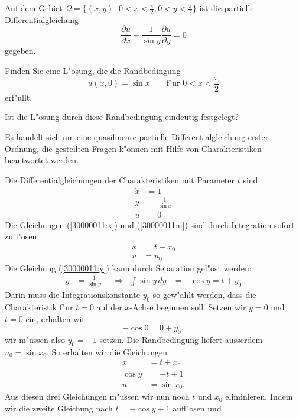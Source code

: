 Auf dem Gebiet $\Omega=\{(x,y)\,|\,0<x<\frac{\pi}2,0<y<\frac{\pi}2\}$
ist die partielle Differentialgleichung
\begin{equation}
\frac{\partial u}{\partial x}
+
\frac1{\sin y}\frac{\partial u}{\partial y}
=
0
\label{30000011:equation}
\end{equation}
gegeben.
\begin{teilaufgaben}
\item
Finden Sie eine L"osung, die die Randbedingung
\[
u(x,0)=\sin x\qquad \text{f"ur $0<x<\frac{\pi}2$}
\]
erf"ullt.
\item
Ist die L"osung durch diese Randbedingung eindeutig festgelegt?
\end{teilaufgaben}

\begin{loesung}
Es handelt sich um eine quasilineare partielle Differentialgleichung erster
Ordnung, die gestellten Fragen k"onnen mit Hilfe von Charakteristiken
beantwortet werden.
\begin{teilaufgaben}
\item
Die Differentialgleichungen der Charakteristiken mit Parameter $t$ sind
\begin{align}
\dot x&=1
\label{30000011:x}
\\
\dot y&=\frac1{\sin x}
\label{30000011:y}
\\
\dot u&=0
\label{30000011:u}
\end{align}
Die Gleichungen (\ref{30000011:x}) und (\ref{30000011:u}) sind durch
Integration sofort zu l"osen:
\begin{align*}
x&=t+x_0\\
u&=u_0
\end{align*}
Die Gleichung (\ref{30000011:y}) kann durch Separation gel"ost werden:
\[
\begin{aligned}
\dot y&=\frac1{\sin y}
&&\Rightarrow&
\int \sin y\,dy&=-\cos y=t+y_0
\end{aligned}
\]
Darin muss die Integrationskonstante $y_0$ so gew"ahlt werden,
dass die Charakteristik f"ur $t=0$ auf der $x$-Achse beginnen soll.
Setzen wir $y=0$ und $t=0$ ein, erhalten wir
\[
-\cos 0=0+y_0,
\]
wir m"ussen also $y_0=-1$ setzen.
Die Randbedingung liefert ausserdem $u_0=\sin x_0$. So
erhalten wir die Gleichungen
\begin{align*}
x&=t+x_0\\
\cos y&=-t+1\\
u&=\sin x_0.
\end{align*}
Aus diesen drei Gleichungen m"ussen wir nun noch $t$ und $x_0$ eliminieren.
Indem wir die zweite Gleichung nach $t=-\cos y + 1$ aufl"osen und

\end{teilaufgaben}
\end{loesung}
